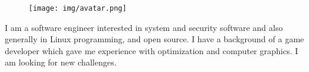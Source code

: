 \documentclass{mycv}
\begin{document}
\begin{paracol}{3}


  \begin{figure}[h!]
    \centering
    \texttt{[image: img/avatar.png]}
  \end{figure}

  \vspace{1cm}


\vspace{10mm}


{\small{
    I am a software engineer interested in system and security software and also generally in Linux programming, and open source. I have a background of a game developer which gave me experience with optimization and computer graphics. I am looking for new challenges.
  }
}


\end{paracol}
\end{document}
